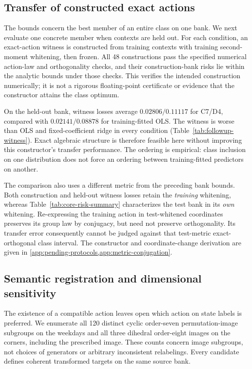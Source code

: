 \subsection{Transfer of constructed exact actions}
\label{sec:witness-transfer}

The bounds concern the best member of an entire class on one bank. We next evaluate one concrete member when contexts are held out. For each condition, an exact-action witness is constructed from training contexts with training second-moment whitening, then frozen. All 48 constructions pass the specified numerical action-law and orthogonality checks, and their construction-bank risks lie within the analytic bounds under those checks. This verifies the intended construction numerically; it is not a rigorous floating-point certificate or evidence that the constructor attains the class optimum.

On the held-out bank, witness losses average $0.02806/0.11117$ for C7/D4, compared with $0.02141/0.08878$ for training-fitted OLS. The witness is worse than OLS and fixed-coefficient ridge in every condition (Table~\ref{tab:followup-witness}). Exact algebraic structure is therefore feasible here without improving this constructor's transfer performance. The ordering is empirical: class inclusion on one distribution does not force an ordering between training-fitted predictors on another.

The comparison also uses a different metric from the preceding bank bounds. Both construction and held-out witness losses retain the \emph{training} whitening, whereas Table~\ref{tab:core-risk-summary} characterizes the test bank in its \emph{own} whitening. Re-expressing the training action in test-whitened coordinates preserves its group law by conjugacy, but need not preserve orthogonality. Its transfer error consequently cannot be judged against that test-metric exact-orthogonal class interval. The constructor and coordinate-change derivation are given in \cref{app:pending-protocols,app:metric-conjugation}.

\subsection{Semantic registration and dimensional sensitivity}
\label{sec:registration-sensitivity}
The existence of a compatible action leaves open which action on state labels is preferred. We enumerate all 120 distinct cyclic order-seven permutation-image subgroups on the weekdays and all three dihedral order-eight images on the corners, including the prescribed image. These counts concern image subgroups, not choices of generators or arbitrary inconsistent relabelings. Every candidate defines coherent transformed targets on the same source bank.

